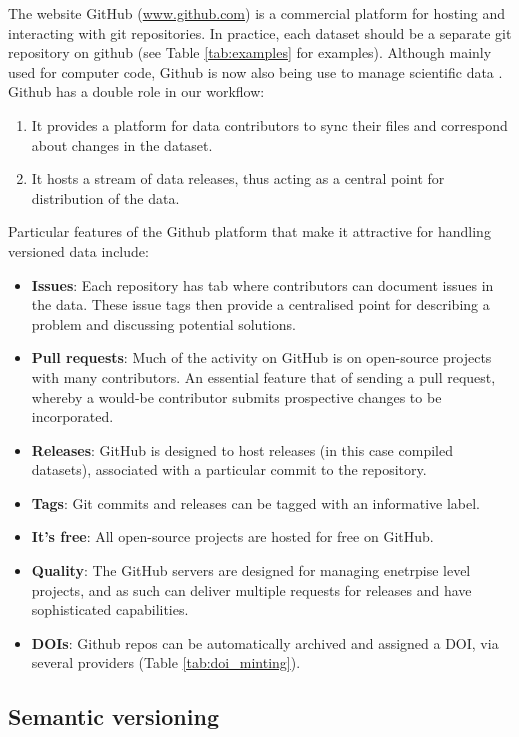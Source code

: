 \documentclass[a4paper,11pt]{article}
\newcommand{\smurl}[1]{{\footnotesize\url{#1}}}
\begin{document}
The website GitHub (\smurl{www.github.com}) is a commercial platform for
hosting and interacting with git repositories. In practice, each dataset
should be a separate git repository on github (see Table \ref{tab:examples} for
examples). Although mainly used for
computer code, Github is now also being use to manage scientific data
\citep{Perkel-2016}. Github has a double role in our workflow:
\begin{enumerate}
  \item It provides a platform for data contributors to sync their files
  and correspond about changes in the dataset.
  \item It hosts a stream of data releases, thus acting as a central
  point for distribution of the data.
\end{enumerate}


Particular features of the Github platform that make it attractive for
handling versioned data include:

\begin{itemize}
  \item \textbf{Issues}: Each repository has tab where contributors can document issues in the data. These issue tags then provide a centralised point for describing a problem and discussing potential solutions.
  \item \textbf{Pull requests}: Much of the activity on GitHub is on open-source projects with many contributors. An essential feature that of sending a pull request, whereby a would-be contributor submits prospective changes to be incorporated.
  \item \textbf{Releases}: GitHub is designed to host releases (in this case compiled datasets), associated with a particular commit to the repository.
  \item \textbf{Tags}: Git commits and releases can be tagged with an informative label.
  \item \textbf{It's free}: All open-source projects are hosted for free on GitHub.
  \item \textbf{Quality}: The GitHub servers are designed for managing enetrpise level projects, and as such can deliver multiple requests for releases and have sophisticated capabilities.
  \item \textbf{DOIs}: Github repos can be automatically archived and assigned a DOI, via several providers (Table \ref{tab:doi_minting}).
\end{itemize}

\subsection{Semantic versioning}
\end{document}

